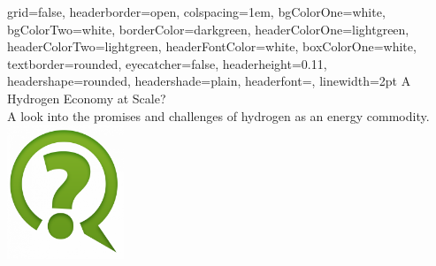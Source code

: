 \documentclass[a0paper,portrait]{baposter}
\begin{document}

\begin{poster}
{
grid=false,
headerborder=open, %
colspacing=1em, %
bgColorOne=white, %
bgColorTwo=white, %
borderColor=darkgreen, %
headerColorOne=lightgreen, %
headerColorTwo=lightgreen, %
headerFontColor=white, %
boxColorOne=white, %
textborder=rounded, %
eyecatcher=false, %
headerheight=0.11\textheight, %
headershape=rounded, %
headershade=plain,
headerfont=\Large\textsf, %
linewidth=2pt %
}
{}
%
%
{
\textsf %
{A Hydrogen Economy at Scale?
}
} %
{\sf\vspace{0.5em}\\
A look into the promises and challenges of hydrogen as an energy commodity.
}
{\includegraphics[width=35mm,scale=0.35]{favpng_question-mark-logo-information}} %



\end{poster}
\end{document}
